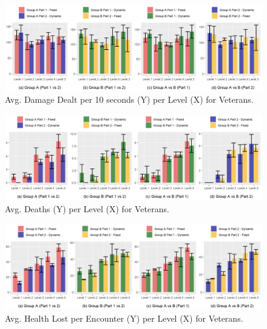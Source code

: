\begin{figure}[!ht]
    \begin{center}
    \caption{Avg. Damage Dealt per 10 seconds (Y) per Level (X) for Veterans.}
        \includegraphics[width=34em]{figures/damage_dealt_per_10s-veteran_players.png}
    \end{center}
    \label{fig:result-metric-veterans-damage-dealt-per-10s}
\end{figure}

\begin{figure}[!ht]
    \begin{center}
    \caption{Avg. Deaths (Y) per Level (X) for Veterans.}
        \includegraphics[width=34em]{figures/deaths_per_level-veteran_players.png}
    \end{center}
    \label{fig:result-metric-veterans-deaths-per-level}
\end{figure}

\begin{figure}[!ht]
    \begin{center}
    \caption{Avg. Health Lost per Encounter (Y) per Level (X) for Veterans.}
        \includegraphics[width=34em]{figures/health_lost_per_encounter-veteran_players.png}
    \end{center}
    \label{fig:result-metric-veterans-health-lost-per-encounter}
\end{figure}

